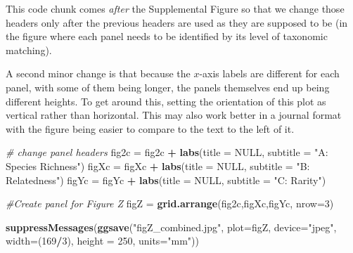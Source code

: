 \documentclass[
]{article}
\newenvironment{Shaded}{\begin{snugshade}}{\end{snugshade}}
\newcommand{\CommentTok}[1]{\textcolor[rgb]{0.56,0.35,0.01}{\textit{#1}}}
\newcommand{\DataTypeTok}[1]{\textcolor[rgb]{0.13,0.29,0.53}{#1}}
\newcommand{\DecValTok}[1]{\textcolor[rgb]{0.00,0.00,0.81}{#1}}
\newcommand{\KeywordTok}[1]{\textcolor[rgb]{0.13,0.29,0.53}{\textbf{#1}}}
\newcommand{\NormalTok}[1]{#1}
\newcommand{\OperatorTok}[1]{\textcolor[rgb]{0.81,0.36,0.00}{\textbf{#1}}}
\newcommand{\OtherTok}[1]{\textcolor[rgb]{0.56,0.35,0.01}{#1}}
\newcommand{\StringTok}[1]{\textcolor[rgb]{0.31,0.60,0.02}{#1}}
\begin{document}
This code chunk comes \emph{after} the Supplemental Figure so that we
change those headers only after the previous headers are used as they
are supposed to be (in the figure where each panel needs to be
identified by its level of taxonomic matching).

A second minor change is that because the \(x\)-axis labels are
different for each panel, with some of them being longer, the panels
themselves end up being different heights. To get around this, setting
the orientation of this plot as vertical rather than horizontal. This
may also work better in a journal format with the figure being easier to
compare to the text to the left of it.

\begin{Shaded}
\begin{Highlighting}[]
\CommentTok{# change panel headers}
\NormalTok{fig2c =}\StringTok{ }\NormalTok{fig2c }\OperatorTok{+}\StringTok{ }\KeywordTok{labs}\NormalTok{(}\DataTypeTok{title =} \OtherTok{NULL}\NormalTok{, }\DataTypeTok{subtitle =} \StringTok{"A: Species Richness"}\NormalTok{)}
\NormalTok{figXc =}\StringTok{ }\NormalTok{figXc }\OperatorTok{+}\StringTok{ }\KeywordTok{labs}\NormalTok{(}\DataTypeTok{title =} \OtherTok{NULL}\NormalTok{, }\DataTypeTok{subtitle =} \StringTok{"B: Relatedness"}\NormalTok{)}
\NormalTok{figYc =}\StringTok{ }\NormalTok{figYc }\OperatorTok{+}\StringTok{ }\KeywordTok{labs}\NormalTok{(}\DataTypeTok{title =} \OtherTok{NULL}\NormalTok{, }\DataTypeTok{subtitle =} \StringTok{"C: Rarity"}\NormalTok{)}

\CommentTok{#Create panel for Figure Z}
\NormalTok{figZ =}\StringTok{ }\KeywordTok{grid.arrange}\NormalTok{(fig2c,figXc,figYc, }\DataTypeTok{nrow=}\DecValTok{3}\NormalTok{)}
\end{Highlighting}
\end{Shaded}

\begin{Shaded}
\begin{Highlighting}[]
\KeywordTok{suppressMessages}\NormalTok{(}\KeywordTok{ggsave}\NormalTok{(}\StringTok{"figZ_combined.jpg"}\NormalTok{, }\DataTypeTok{plot=}\NormalTok{figZ, }\DataTypeTok{device=}\StringTok{"jpeg"}\NormalTok{, }\DataTypeTok{width=}\NormalTok{(}\DecValTok{169}\OperatorTok{/}\DecValTok{3}\NormalTok{), }\DataTypeTok{height =} \DecValTok{250}\NormalTok{, }\DataTypeTok{units=}\StringTok{"mm"}\NormalTok{))}
\end{Highlighting}
\end{Shaded}
\end{document}
